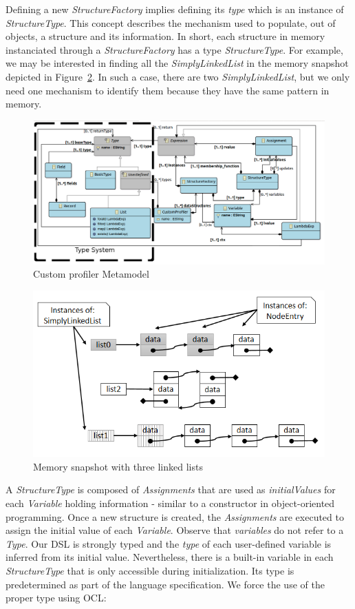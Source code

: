 Defining a new \textit{StructureFactory} implies defining its \textit{type} which is an instance of \textit{StructureType}.
This concept describes the mechanism used to populate, out of objects, a structure and its information.
In short, each structure in memory instanciated through a \textit{StructureFactory} has a type \textit{StructureType}.
For example, we may be interested in finding all the \textit{SimplyLinkedList} in the memory snapshot depicted in Figure~\ref{fig:simple_snapshot}.
In such a case, there are two \textit{SimplyLinkedList}, but we only need one mechanism to identify them because they have the same pattern in memory. 

\begin{figure}
\centering
\includegraphics[width=0.87\linewidth]{chapter6/fig/AS}
\caption{Custom profiler Metamodel}
\label{fig:as}
\end{figure}

\begin{figure}
\centering
\includegraphics[width=0.65\linewidth]{chapter6/fig/lists}
\caption{Memory snapshot with three linked lists}
\label{fig:simple_snapshot}
\end{figure}

A \textit{StructureType} is composed of \textit{Assignments} that are used as \textit{initialValues} for each \textit{Variable} holding information - similar to a constructor in object-oriented programming.
Once a new structure is created, the \textit{Assignments} are executed to assign the initial value of each \textit{Variable}.
Observe that \textit{variables} do not refer to a \textit{Type}.
Our DSL is strongly typed and the \textit{type} of each user-defined variable is inferred from its initial value.
Nevertheless, there is a built-in variable in each \textit{StructureType} that is only accessible during initialization.
Its type is predetermined as part of the language specification.
We force the use of the proper type using OCL:

